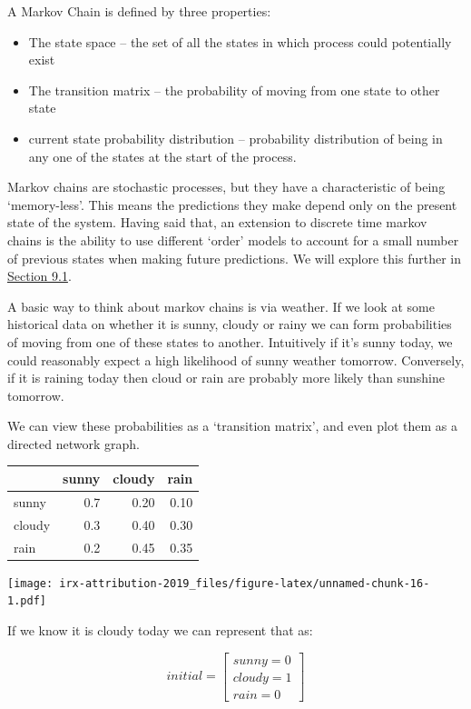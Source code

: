 \documentclass[]{book}
\providecommand{\tightlist}{%
  \setlength{\itemsep}{0pt}\setlength{\parskip}{0pt}}
\begin{document}
A Markov Chain is defined by three properties:

\begin{itemize}
\tightlist
\item
  The state space -- the set of all the states in which process could potentially exist
\item
  The transition matrix -- the probability of moving from one state to other state
\item
  current state probability distribution -- probability distribution of being in any one of the states at the start of the process.
\end{itemize}

Markov chains are stochastic processes, but they have a characteristic of being
`memory-less'. This means the predictions they make depend only on the present
state of the system. Having said that, an extension to discrete time markov chains
is the ability to use different `order' models to account for a small number
of previous states when making future predictions. We will explore this further
in \protect\hyperlink{markov-chains}{Section 9.1}.

A basic way to think about markov chains is via weather. If we look at some historical data
on whether it is sunny, cloudy or rainy we can form probabilities of moving from
one of these states to another. Intuitively if it's sunny today, we could reasonably expect a high likelihood of
sunny weather tomorrow. Conversely, if it is raining today then cloud or rain
are probably more likely than sunshine tomorrow.

We can view these probabilities as a `transition matrix', and even plot them
as a directed network graph.

\begin{tabular}{l|r|r|r}
\hline
  & sunny & cloudy & rain\\
\hline
sunny & 0.7 & 0.20 & 0.10\\
\hline
cloudy & 0.3 & 0.40 & 0.30\\
\hline
rain & 0.2 & 0.45 & 0.35\\
\hline
\end{tabular}

\texttt{[image: irx-attribution-2019\_files/figure-latex/unnamed-chunk-16-1.pdf]}

If we know it is cloudy today we can represent that as:

\[
initial = \begin{bmatrix} sunny = 0 \\ cloudy = 1 \\ rain = 0\end{bmatrix}
\]
\end{document}
